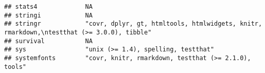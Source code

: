 \documentclass[
]{article}
\begin{document}
\begin{verbatim}
## stats4             NA                                                                                                                                                                                                                                                                                                                                                                                                                                                                                
## stringi            NA                                                                                                                                                                                                                                                                                                                                                                                                                                                                                
## stringr            "covr, dplyr, gt, htmltools, htmlwidgets, knitr, rmarkdown,\ntestthat (>= 3.0.0), tibble"                                                                                                                                                                                                                                                                                                                                                                                         
## survival           NA                                                                                                                                                                                                                                                                                                                                                                                                                                                                                
## sys                "unix (>= 1.4), spelling, testthat"                                                                                                                                                                                                                                                                                                                                                                                                                                               
## systemfonts        "covr, knitr, rmarkdown, testthat (>= 2.1.0), tools"                                                                                                                                                                                                                                                                                                                                                                                                                              

\end{verbatim}
\end{document}
